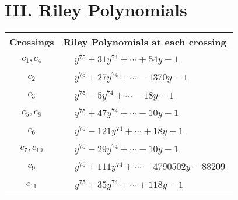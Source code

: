\documentclass[1p]{elsarticle_modified}
\theoremstyle{definition}
\begin{document}
\centering \section*{ III. Riley Polynomials}
\begin{tabular}{m{50pt}|m{274pt}}
Crossings & \hspace{64pt}Riley Polynomials at each crossing \\
\hline $$\begin{aligned}c_{1},c_{4}\end{aligned}$$&$\begin{aligned}
&y^{75}+31 y^{74}+\cdots+54 y-1
\end{aligned}$\\
\hline $$\begin{aligned}c_{2}\end{aligned}$$&$\begin{aligned}
&y^{75}+27 y^{74}+\cdots-1370 y-1
\end{aligned}$\\
\hline $$\begin{aligned}c_{3}\end{aligned}$$&$\begin{aligned}
&y^{75}-5 y^{74}+\cdots-18 y-1
\end{aligned}$\\
\hline $$\begin{aligned}c_{5},c_{8}\end{aligned}$$&$\begin{aligned}
&y^{75}+47 y^{74}+\cdots-10 y-1
\end{aligned}$\\
\hline $$\begin{aligned}c_{6}\end{aligned}$$&$\begin{aligned}
&y^{75}-121 y^{74}+\cdots+18 y-1
\end{aligned}$\\
\hline $$\begin{aligned}c_{7},c_{10}\end{aligned}$$&$\begin{aligned}
&y^{75}-29 y^{74}+\cdots-10 y-1
\end{aligned}$\\
\hline $$\begin{aligned}c_{9}\end{aligned}$$&$\begin{aligned}
&y^{75}+111 y^{74}+\cdots-4790502 y-88209
\end{aligned}$\\
\hline $$\begin{aligned}c_{11}\end{aligned}$$&$\begin{aligned}
&y^{75}+35 y^{74}+\cdots+118 y-1
\end{aligned}$\\
\hline
\end{tabular}
\vskip 2pc
\end{document}
